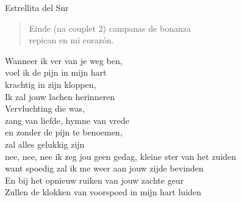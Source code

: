 \begin{song}[vals]{Estrellita del Sur}
\begin{verse}{Einde (na couplet 2)}
campanas de bonanza\\
repican en mi corazón.\hspace{1em}\hspace{2em}\hspace{1.5em}\\
\end{verse}
\begin{translation}
Wanneer ik ver van je weg ben,\\
voel ik de pijn in mijn hart\\
krachtig in zijn kloppen,\\
Ik zal jouw lachen herinneren\\
Vervluchting die was,\\
zang van liefde, hymne van vrede\\
en zonder de pijn te benoemen,\\
zal alles gelukkig zijn\\
\vspace{1em}
nee, nee, nee ik zeg jou geen gedag, kleine ster van het zuiden\\
want spoedig zal ik me weer aan jouw zijde bevinden\\
En bij het opnieuw ruiken van jouw zachte geur\\
Zullen de klokken van voorspoed in mijn hart luiden\\
\end{translation}
\end{song}
